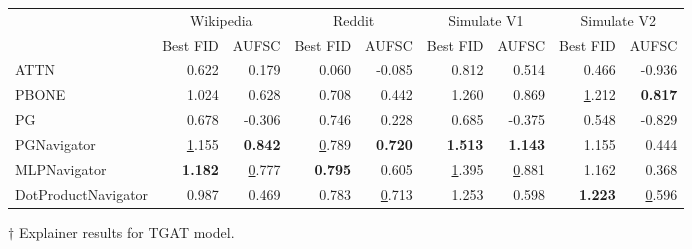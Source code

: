 \begin{tabular}{lrrrrrrrr}
\toprule
 & \multicolumn{2}{c}{Wikipedia} & \multicolumn{2}{c}{Reddit} & \multicolumn{2}{c}{Simulate V1} & \multicolumn{2}{c}{Simulate V2} \\
 & Best FID & AUFSC & Best FID & AUFSC & Best FID & AUFSC & Best FID & AUFSC \\
\midrule
ATTN & 0.622 & 0.179 & 0.060 & -0.085 & 0.812 & 0.514 & 0.466 & -0.936 \\
PBONE & 1.024 & 0.628 & 0.708 & 0.442 & 1.260 & 0.869 & \underline 1.212 & \bfseries 0.817 \\
PG & 0.678 & -0.306 & 0.746 & 0.228 & 0.685 & -0.375 & 0.548 & -0.829 \\
PGNavigator & \underline 1.155 & \bfseries 0.842 & \underline 0.789 & \bfseries 0.720 & \bfseries 1.513 & \bfseries 1.143 & 1.155 & 0.444 \\
MLPNavigator & \bfseries 1.182 & \underline 0.777 & \bfseries 0.795 & 0.605 & \underline 1.395 & \underline 0.881 & 1.162 & 0.368 \\
DotProductNavigator & 0.987 & 0.469 & 0.783 & \underline 0.713 & 1.253 & 0.598 & \bfseries 1.223 & \underline 0.596 \\
\bottomrule
\end{tabular}
\caption{\label{tab:tgat_results}$\dagger$ Explainer results for TGAT model.}
